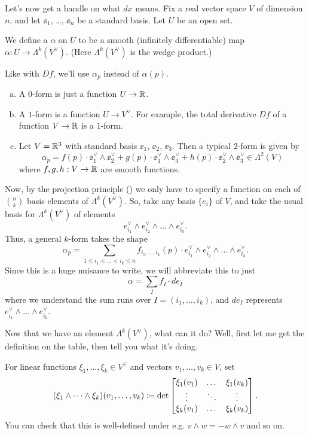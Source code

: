 Let's now get a handle on what $dx$ means.
Fix a real vector space $V$ of dimension $n$,
and let $\ee_1$, \dots, $\ee_n$ be a standard basis.
Let $U$ be an open set.

\begin{definition}
	We define a  $\alpha$ on $U$
	to be a smooth (infinitely differentiable) map
	$\alpha : U \to \Lambda^k(V^\vee)$.
	(Here $\Lambda^k(V^\vee)$ is the wedge product.)
\end{definition}

Like with $Df$, we'll use $\alpha_p$ instead of $\alpha(p)$.

\begin{example}
	[$k$-forms for $k=0,1$]
	\listhack
	\begin{enumerate}[(a)]
		\item A $0$-form is just a function $U \to \mathbb R$.
		\item A $1$-form is a function $U \to V^\vee$.
		For example,
		the total derivative $Df$ of a function $V \to \mathbb R$ is a $1$-form.
		\item Let $V = \mathbb R^3$ with standard basis $\ee_1$, $\ee_2$, $\ee_3$.
		Then a typical $2$-form is given by
		\[
			\alpha_p
			=
			f(p) \cdot \ee_1^\vee \wedge \ee_2^\vee
			+ g(p) \cdot \ee_1^\vee \wedge \ee_3^\vee
			+ h(p) \cdot \ee_2^\vee \wedge \ee_3^\vee
			\in \Lambda^2(V)
		\]
		where $f,g,h : V \to \mathbb R$ are smooth functions.
	\end{enumerate}
\end{example}

Now, by the projection principle () we only have to specify
a function on each of $\binom nk$ basis elements of $\Lambda^k(V^\vee)$.
So, take any basis $\{e_i\}$ of $V$, and 
take the usual basis for $\Lambda^k(V^\vee)$ of elements
\[ e_{i_1}^\vee \wedge e_{i_2}^\vee \wedge \dots \wedge e_{i_k}^\vee. \]
Thus, a general $k$-form takes the shape
\[ \alpha_p = \sum_{1 \le i_1 < \dots < i_k \le n} 
	f_{i_1, \dots, i_k}(p) \cdot
	e_{i_1}^\vee \wedge e_{i_2}^\vee \wedge \dots \wedge e_{i_k}^\vee. \]
Since this is a huge nuisance to write, we will abbreviate this to just
\[ \alpha = \sum_I f_I \cdot de_I \]
where we understand the sum runs over $I = (i_1, \dots, i_k)$,
and $de_I$ represents $e_{i_1}^\vee \wedge \dots \wedge e_{i_k}^\vee$.

Now that we have an element $\Lambda^k(V^\vee)$, what can it do?
Well, first let me get the definition on the table, then tell you what it's doing.
\begin{definition}
	For linear functions $\xi_1, \dots, \xi_k \in V^\vee$
	and vectors $v_1, \dots, v_k \in V$, set
	\[
		(\xi_1 \wedge \dots \wedge \xi_k)(v_1, \dots, v_k)
		\coloneqq
		\det
		\begin{bmatrix}
			\xi_1(v_1) & \dots & \xi_1(v_k) \\
			\vdots & \ddots & \vdots \\
			\xi_k(v_1) & \dots & \xi_k(v_k)
		\end{bmatrix}.
	\]
	You can check that this is well-defined
	under e.g. $v \wedge w = -w \wedge v$ and so on.
\end{definition}

